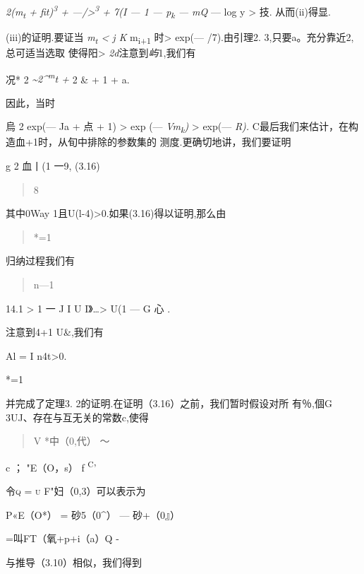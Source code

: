 \emph{2(m\textsubscript{t} + fit)\textsuperscript{3} +
---/\textgreater{}\textsuperscript{3} + 7(I --- 1 --- p\textsubscript{k}
--- mQ} --- log y \textgreater{} 技. 从而(ii)得显.

(iii)的证明.要证当 \emph{m\textsubscript{t} \textless{} j K}
m\textsubscript{i+1} 时\textgreater{} exp(--- /7).由引理2.
3,只要a。充分靠近2,总可适当选取 使得阳\textgreater{}
\emph{2d}注意到\emph{屿}1,我们有

况* 2 \emph{\textasciitilde{}2\^{}\textsuperscript{m}t +} 2 \& + 1 + a.

因此，当时

\textbar{}烏 \textbar{} 2 exp(--- Ja + 点 + 1) \textgreater{} exp (---
\emph{Vm\textsubscript{k})} \textgreater{} exp(--- \emph{R).}
C最后我们来估计，在构造血+1时，从旬中排除的参数集的
测度.更确切地讲，我们要证明

\textbar{}g\textbar{} 2 \textbar{}血丨(1 一9, (3.16)

\begin{quote}
8
\end{quote}

其中0Way 1且U(l-4)\textgreater{}0.如果(3.16)得以证明,那么由

\begin{quote}
*=1
\end{quote}

归纳过程我们有

\begin{quote}
n---1
\end{quote}

14.1 \textgreater{} \textbar{}1 一 J I U I》\ldots{}\textgreater{} U(1
--- G 心 \textbar{}.

注意到4+1 U\&,我们有

Al = I n4t\textbar{}\textgreater{}0.

*=1

并完成了定理3. 2的证明.在证明（3.16）之前，我们暂时假设对所 有％,個G
3UJ、存在与互无关的常数c,使得

\begin{quote}
V {\textbar{}*中（0,代）\textbar{}} 〜
\end{quote}

c ； \textbar{}"E（O，s）\textbar{} f \textsuperscript{C}'

令\textsc{q = u} F"妇（0,3）可以表示为

\textbar{}P«E（O*）\textbar{} = \textbar{}砂5（0\^{}） ---
砂+（0』）\textbar{}

=叫FT（氧+p+i（a）Q -

与推导（3.10）相似，我们得到

